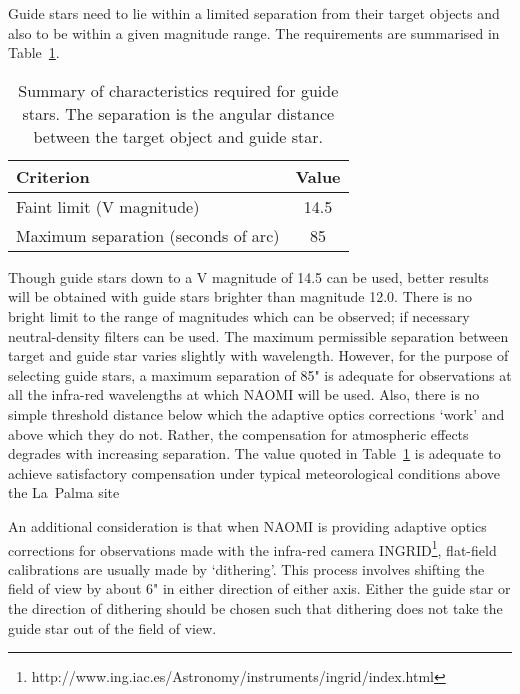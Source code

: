 \documentclass[twoside,11pt]{article}
\newcommand{\htmladdnormallinkfoot}[2]{#1\footnote{#2}}
\renewcommand{\_}{\texttt{\symbol{95}}}
\begin{document}
Guide stars need to lie within a limited separation from their target
objects and also to be within a given magnitude range.  The requirements
are summarised in Table~\ref{GSCHARACT}.

\begin{table}[htbp]

\begin{center}
\begin{tabular}{lc}
Criterion                           &  Value \\ \hline
Faint limit (V magnitude)           & 14.5   \\
Maximum separation (seconds of arc) & 85     \\
\end{tabular}
\end{center}

\begin{quote}
\caption[Summary of guide star characteristics]{Summary of characteristics
required for guide stars.  The separation is the angular distance between
the target object and guide star.
\label{GSCHARACT} }
\end{quote}

\end{table}

Though guide stars down to a V magnitude of 14.5 can be used, better
results will be obtained with guide stars brighter than magnitude 12.0.
There is no bright limit to the range of magnitudes which can be observed;
if necessary neutral-density filters can be used.  The maximum permissible
separation between target and guide star varies slightly with wavelength.  
However, for the purpose of selecting guide stars, a maximum separation
of 85" is adequate for observations at all the infra-red wavelengths at
which NAOMI will be used.  Also, there is no simple threshold distance below
which the adaptive optics corrections `work' and above which they do not.
Rather, the compensation for atmospheric effects degrades with increasing
separation.  The value quoted in Table~\ref{GSCHARACT} is adequate to
achieve satisfactory compensation under typical meteorological conditions
above the La~Palma site

An additional consideration is that when NAOMI is providing adaptive
optics corrections for observations made with the infra-red camera
\htmladdnormallinkfoot{INGRID}
{http://www.ing.iac.es/Astronomy/instruments/ingrid/index.html},
flat-field calibrations are usually made by `dithering'.  This process
involves shifting the field of view by about 6" in either direction of
either axis.  Either the guide star or the direction of dithering should be
chosen such that dithering does not take the guide star out of the field of
view.
\end{document}
